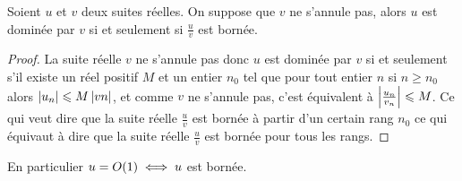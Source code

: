 \begin{prop}
  Soient \(u\) et \(v\) deux suites réelles. On suppose que \(v\) ne s'annule pas, alors \(u\) est dominée par \(v\) si et seulement si \(\frac{u}{v}\) est bornée.
\end{prop}
\begin{proof}
    La suite réelle \(v\) ne s'annule pas donc \(u\) est dominée par \(v\) si et seulement s'il existe un réel positif \(M\) et un entier \(n_0\) tel que pour tout entier \(n\) si \(n \geqslant n_0\) alors \(\left\lvert u_n\right\rvert \leqslant M \left\lvert vn\right\rvert\), et comme \(v\) ne s'annule pas, c'est équivalent à \(\left\lvert\frac{u_n}{v_n}\right\rvert \leqslant M\). Ce qui veut dire que la suite réelle \(\frac{u}{v}\) est bornée à partir d'un certain rang \(n_0\) ce qui équivaut à dire que la suite réelle \(\frac{u}{v}\) est bornée pour tous les rangs.
\end{proof}

En particulier \(u = O\mathopen{}\left(1\right) \iff u\) est bornée.

